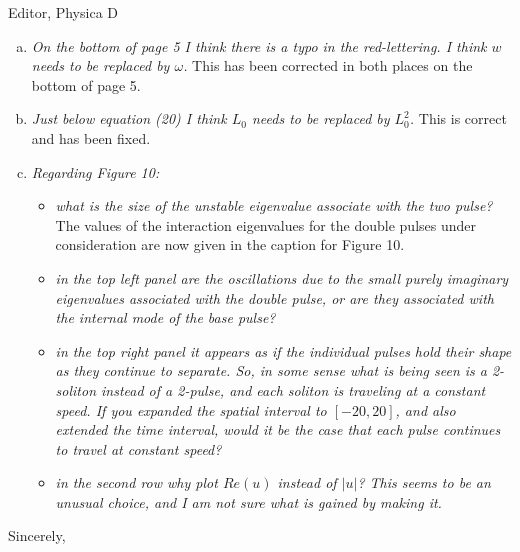 \documentclass[11pt]{letter}
\begin{document}
\begin{letter}{Editor, Physica D}
\begin{enumerate}[(a)]
\item \emph{On the bottom of page 5 I think there is a typo in the red-lettering. I think $w$ needs to be replaced by $\omega$.} This has been corrected in both places on the bottom of page 5.

\item \emph{Just below equation (20) I think $L_0$ needs to be replaced by $L_0^2$.} This is correct and has been fixed.

\item \emph{Regarding Figure 10:}

\begin{itemize}
\item \emph{what is the size of the unstable eigenvalue associate with the two pulse?} The values of the interaction eigenvalues for the double pulses under consideration are now given in the caption for Figure 10.

\item \emph{in the top left panel are the oscillations due to the small purely imaginary eigenvalues associated with the double pulse, or are they associated with the internal mode of the base pulse?}

\item \emph{in the top right panel it appears as if the individual pulses hold their shape as they continue to separate. So, in some sense what is being seen is a 2-soliton instead of a 2-pulse, and each soliton is traveling at a constant speed. If you expanded the spatial interval to $[-20, 20]$, and also extended the time interval, would it be the case that each pulse continues to travel at constant speed?}

\item \emph{in the second row why plot $Re(u)$ instead of $|u|$? This seems to be an unusual choice, and I am not sure what is gained by making it.}

\end{itemize}

\end{enumerate}

\closing{Sincerely,}

\end{letter}
\end{document}
